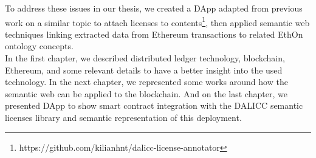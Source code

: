 To address these issues in our thesis, we created a DApp adapted from previous work on a similar topic to attach licenses to contents\footnote{https://github.com/kilianhnt/dalicc-license-annotator}, then applied semantic web techniques linking extracted data from Ethereum transactions to related EthOn ontology concepts. \\
In the first chapter, we described distributed ledger technology, blockchain, Ethereum, and some relevant details to have a better insight into the used technology. In the next chapter, we represented some works around how the semantic web can be applied to the blockchain. And on the last chapter, we presented DApp to show smart contract integration with the DALICC semantic licenses library and semantic representation of this deployment.